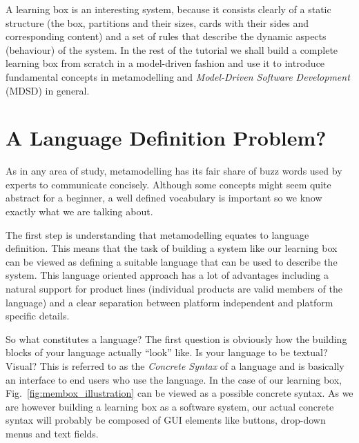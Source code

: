A learning box is an interesting system, because it consists clearly of a static structure (the box, partitions and their sizes, cards with their sides and corresponding content) and a set of rules that describe the dynamic aspects
(behaviour) of the system.
In the rest of the tutorial we shall build a complete learning box from scratch in a model-driven fashion and use it to introduce fundamental concepts in metamodelling and \emph{Model-Driven Software Development} (MDSD) in general.

\section{A Language Definition Problem?}

As in any area of study, metamodelling has its fair share of buzz words used by experts to communicate concisely.  Although some concepts might seem quite abstract for a beginner, a well defined vocabulary is important so we know
exactly what we are talking about.

The first step is understanding that metamodelling equates to language definition.
This means that the task of building a system like our learning box can be viewed as defining a suitable language that can be used to describe the system.
This language oriented approach has a lot of advantages including a natural support for product lines (individual products are valid members of the language) and a clear separation between platform independent and platform specific details.

So what constitutes a language?  The first question is obviously  how the building blocks of your language actually ``look'' like.
Is your language to be textual?  Visual?  This is referred to as the \emph{Concrete Syntax} of a language and is basically an interface to end users who use the language.
In the case of our learning box, Fig.~\ref{fig:membox_illustration} can be viewed as a possible concrete syntax.
As we are however building a learning box as a software system, our actual concrete syntax  will probably be composed of GUI elements like buttons, drop-down menus and text fields.

